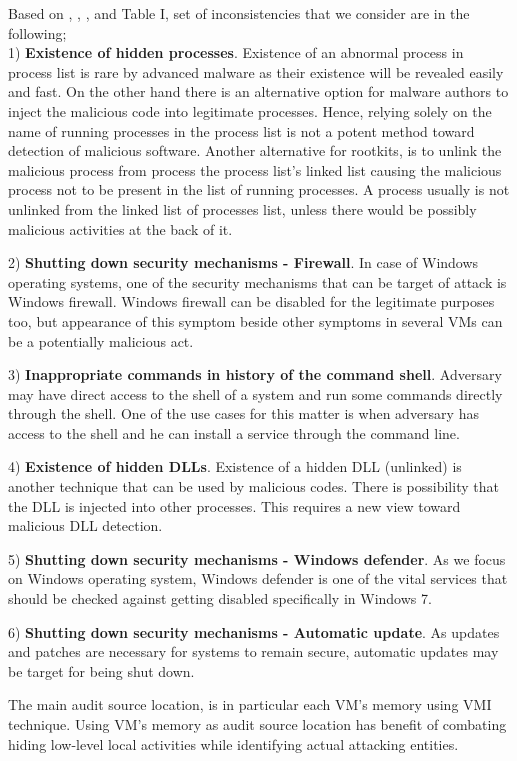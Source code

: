 \documentclass[conference]{IEEEtran}
\begin{document}
Based on \cite{ref43}, \cite{ref44}, \cite{ref21}, \cite{ref35} and Table I, set of inconsistencies that we consider are in the following; \\

1) \textbf{Existence of hidden processes}. Existence of an abnormal process in process list is rare by advanced malware as their existence will be revealed easily and fast. On the other hand there is an alternative option for malware authors to inject the malicious code into legitimate processes. Hence, relying solely on the name of running processes in the process list is not a  potent method toward detection of malicious software. Another alternative for rootkits, is to unlink the malicious process from process the process list's linked list causing the malicious process not to be present in the list of running processes. A process usually is not unlinked from the linked list of processes list, unless there would be possibly malicious activities at the back of it. 

2) \textbf{ Shutting down security mechanisms - Firewall}. In case of Windows operating systems, one of the security mechanisms that can be target of attack is Windows firewall. Windows firewall can be disabled for the legitimate purposes too, but appearance of this symptom beside other symptoms in several VMs can be a potentially malicious act.

3) \textbf{Inappropriate commands in history of the command shell}. Adversary may have direct access to the shell of a system and run some commands directly through the shell. One of the use cases for this matter is when adversary has access to the shell and he can install a service through the command line. 

4) \textbf{Existence of hidden DLLs}. Existence of a hidden DLL (unlinked) is another technique that can be used by malicious codes. There is possibility that the DLL is injected into other processes. This requires a new view toward malicious DLL detection. 

5) \textbf{Shutting down security mechanisms - Windows defender}. As we focus on Windows operating system, Windows defender is one of the vital services that should be checked against getting disabled specifically in Windows 7.

6) \textbf{Shutting down security mechanisms - Automatic update}. As updates and patches are necessary for systems to remain secure, automatic updates may be target for being shut down. 

The main audit source location, is in particular each VM's memory using VMI technique. Using VM's memory as audit source location has benefit of combating hiding low-level local activities while identifying actual attacking entities.
\end{document}
